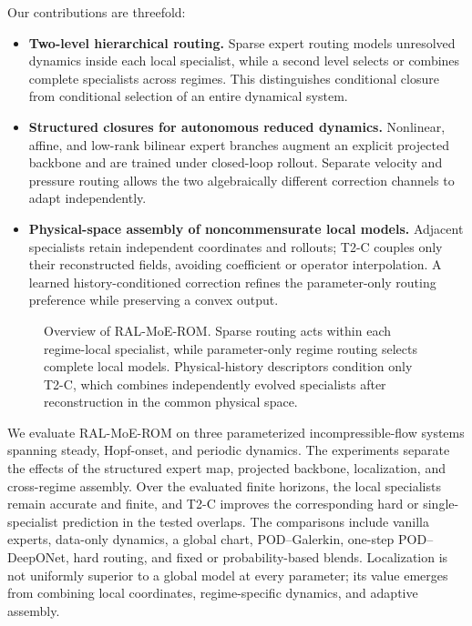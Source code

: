 Our contributions are threefold:
\begin{itemize}
    \item \textbf{Two-level hierarchical routing.} Sparse expert routing models
    unresolved dynamics inside each local specialist, while a second level selects or
    combines complete specialists across regimes. This distinguishes conditional closure
    from conditional selection of an entire dynamical system.

    \item \textbf{Structured closures for autonomous reduced dynamics.} Nonlinear,
    affine, and low-rank bilinear expert branches augment an explicit projected backbone
    and are trained under closed-loop rollout. Separate velocity and pressure routing
    allows the two algebraically different correction channels to adapt independently.

    \item \textbf{Physical-space assembly of noncommensurate local models.} Adjacent
    specialists retain independent coordinates and rollouts; T2-C couples only their
    reconstructed fields, avoiding coefficient or operator interpolation. A learned
    history-conditioned correction refines the parameter-only routing preference while
    preserving a convex output.
\end{itemize}

\begin{figure}[t]
    \centering
    \resizebox{\linewidth}{!}{}
    \caption{Overview of RAL-MoE-ROM. Sparse routing acts within each regime-local
    specialist, while parameter-only regime routing selects complete local models.
    Physical-history descriptors condition only T2-C, which combines independently
    evolved specialists after reconstruction in the common physical space.}
    \label{fig:ral_overview}
\end{figure}

We evaluate RAL-MoE-ROM on three parameterized incompressible-flow systems spanning
steady, Hopf-onset, and periodic dynamics. The experiments separate the effects of the
structured expert map, projected backbone, localization, and cross-regime assembly. Over
the evaluated finite horizons, the local specialists remain accurate and finite, and
T2-C improves the corresponding hard or single-specialist prediction in the tested
overlaps. The comparisons include vanilla experts, data-only dynamics, a global chart,
POD--Galerkin, one-step POD--DeepONet, hard routing, and fixed or probability-based
blends. Localization is not uniformly superior to a global model at every parameter;
its value emerges from combining local coordinates, regime-specific dynamics, and
adaptive assembly.
